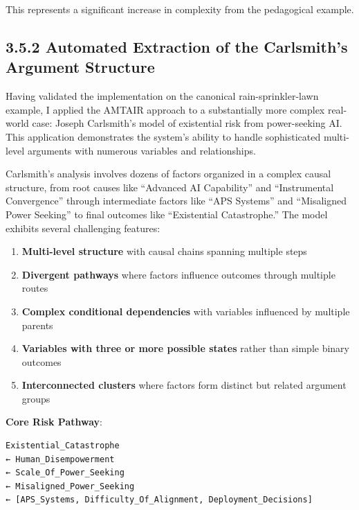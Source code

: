 \documentclass[
  11pt,
  letterpaper,
]{book}
\providecommand{\tightlist}{%
  \setlength{\itemsep}{0pt}\setlength{\parskip}{0pt}}
\begin{document}
\begin{landscape}
This represents a significant increase in complexity from the
pedagogical example.

\subsection*{3.5.2 Automated Extraction of the Carlsmith's Argument
Structure}\label{sec-carlsmith-extraction}

Having validated the implementation on the canonical rain-sprinkler-lawn
example, I applied the AMTAIR approach to a substantially more complex
real-world case: Joseph Carlsmith's model of existential risk from
power-seeking AI. This application demonstrates the system's ability to
handle sophisticated multi-level arguments with numerous variables and
relationships.

Carlsmith's analysis involves dozens of factors organized in a complex
causal structure, from root causes like ``Advanced AI Capability'' and
``Instrumental Convergence'' through intermediate factors like ``APS
Systems'' and ``Misaligned Power Seeking'' to final outcomes like
``Existential Catastrophe.'' The model exhibits several challenging
features:

\begin{enumerate}
\def\labelenumi{\arabic{enumi}.}
\tightlist
\item
  \textbf{Multi-level structure} with causal chains spanning multiple
  steps
\item
  \textbf{Divergent pathways} where factors influence outcomes through
  multiple routes
\item
  \textbf{Complex conditional dependencies} with variables influenced by
  multiple parents
\item
  \textbf{Variables with three or more possible states} rather than
  simple binary outcomes
\item
  \textbf{Interconnected clusters} where factors form distinct but
  related argument groups
\end{enumerate}

\textbf{Core Risk Pathway}:

\begin{verbatim}
Existential_Catastrophe 
← Human_Disempowerment 
← Scale_Of_Power_Seeking
← Misaligned_Power_Seeking
← [APS_Systems, Difficulty_Of_Alignment, Deployment_Decisions]
\end{verbatim}


\end{landscape}
\end{document}
